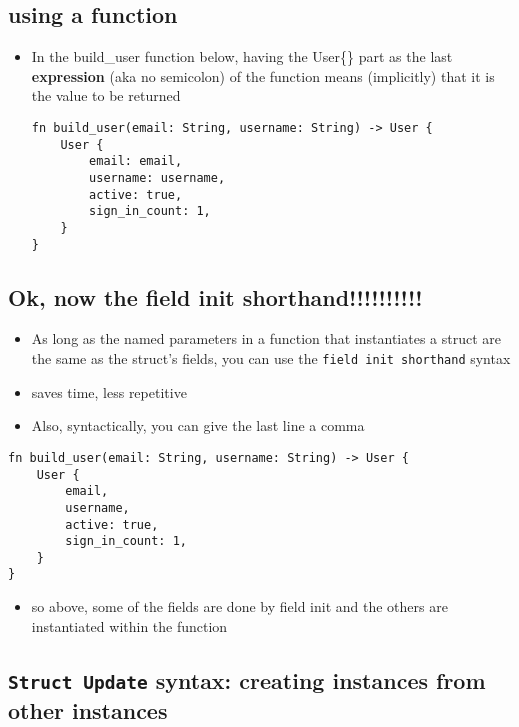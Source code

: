 \documentclass[11pt]{article}
\begin{document}
\subsection{using a function}
\label{sec:orgae9ce4f}
\begin{itemize}
\item In the build\_user function below, having the User\{\} part as the last \textbf{expression} (aka no semicolon) of the function means (implicitly) that it is the value to be returned
\begin{verbatim}
fn build_user(email: String, username: String) -> User {
    User {
        email: email,
        username: username,
        active: true,
        sign_in_count: 1,
    }
}
\end{verbatim}
\end{itemize}
\subsection{Ok, now the field init shorthand!!!!!!!!!!}
\label{sec:org1acc38a}
\begin{itemize}
\item As long as the named parameters in a function that instantiates a struct are the same as the struct's fields, you can use the \texttt{field init shorthand} syntax
\item saves time, less repetitive
\item Also, syntactically, you can give the last line a comma
\end{itemize}
\begin{verbatim}
fn build_user(email: String, username: String) -> User {
    User {
        email,
        username,
        active: true,
        sign_in_count: 1,
    }
}
\end{verbatim}
\begin{itemize}
\item so above, some of the fields are done by field init and the others are instantiated within the function
\end{itemize}
\subsection{\texttt{Struct Update} syntax: creating instances from other instances}
\label{sec:org38b217f}
\end{document}
